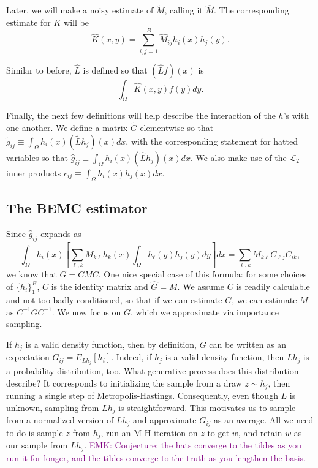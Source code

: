 \documentclass{article}
\newcommand\EMK[1]{\textcolor{purple}{EMK: #1}}
\begin{document}
Later, we will make a noisy estimate of $\tilde{M}$, calling it $\hat M$. The corresponding estimate for $K$ will be 
\begin{equation}
\label{eqn:khatdef}
\hat{K}(x,y) = \sum_{i,j=1}^B \hat M_{ij} h_i(x)h_j(y).\end{equation}

Similar to before, $\hat{L}$ is defined so that $(\hat{L}f)(x)$ is $$\int_{\Omega}\hat{K}(x,y)f(y)dy.$$


Finally, the next few definitions will help describe the interaction of the $h$'s with one another. We define a matrix $\tilde{G}$ elementwise so that $\tilde{g}_{ij}\equiv \int_{\Omega} h_i(x)(\tilde{L}h_j)(x)dx$, with the corresponding statement for hatted variables so that $\hat{g}_{ij}\equiv \int_{\Omega} h_i(x)(\hat{L}h_j)(x)dx$. We also make use of the $\mathcal{L}_2$ inner products $c_{ij}\equiv \int_{\Omega} h_i(x)h_j(x)dx$.

\subsection{The BEMC estimator}

Since $\hat{g}_{ij}$ expands as $$ \int_{\Omega} h_i(x)\left[\sum_{\ell,k} M_{k\ell}h_k(x)\int_{\Omega} h_\ell(y)h_j(y)dy\right]dx= \sum_{\ell,k} M_{k\ell}C_{\ell j}C_{ik},$$ we know that $\hat{G}=CMC$. One nice special case of this formula: for some choices of $\{h_i\}_1^B$, $C$ is the identity matrix and $\hat{G}=M$. We assume $C$ is readily calculable and not too badly conditioned, so that if we can estimate $G$, we can estimate $M$ as $C^{-1}GC^{-1}$. We now focus on $G$, which we approximate via importance sampling. 

If $h_j$ is a valid density function, then by definition, $G$ can be written as an expectation $G_{ij} = E_{Lh_j}[h_i]$. Indeed, if $h_j$ is a valid density function, then $Lh_j$ is a probability distribution, too. What generative process does this distribution describe? It corresponds to initializing the sample from a draw $z\sim h_j$, then running a single step of Metropolis-Hastings. Consequently, even though $L$ is unknown, sampling from $Lh_j$ is straightforward. This motivates us to sample from a normalized version of $Lh_j$ and approximate $G_{ij}$ as an average. All we need to do is sample $z$ from $h_j$, run an M-H iteration on $z$ to get $w$, and retain $w$ as our sample from $Lh_j$. \EMK{Conjecture: the hats converge to the tildes as you run it for longer, and the tildes converge to the truth as you lengthen the basis.}
\end{document}
